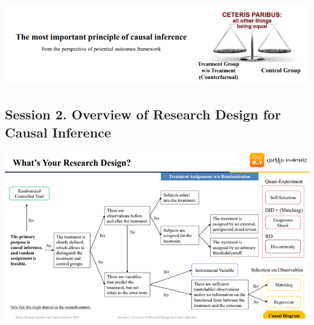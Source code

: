 \documentclass[
]{book}
\theoremstyle{definition}
\theoremstyle{definition}
\theoremstyle{definition}
\theoremstyle{definition}
\theoremstyle{remark}
\begin{document}
\includegraphics{figures/51.png}

\hypertarget{session-2.-overview-of-research-design-for-causal-inference}{%
\subsection{Session 2. Overview of Research Design for Causal Inference}\label{session-2.-overview-of-research-design-for-causal-inference}}

\includegraphics{figures/52.png}
\end{document}
